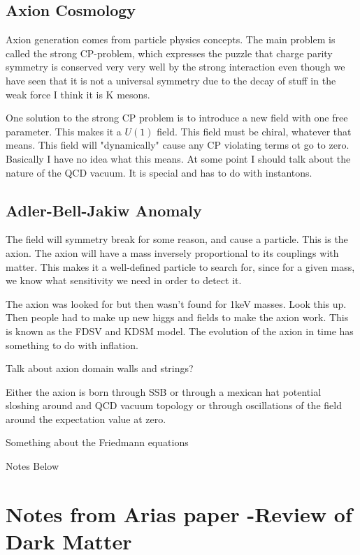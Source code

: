 \documentclass[11pt]{book}
\begin{document}
\subsection{Axion Cosmology}

Axion generation comes from particle physics concepts. The main problem is called the strong CP-problem, which expresses the puzzle that charge parity symmetry is conserved very very well by the strong interaction even though we have seen that it is not a universal symmetry due to the decay of stuff in the weak force I think it is K mesons.

One solution to the strong CP problem is to introduce a new field with one free parameter. This makes it a $U(1)$ field. This field must be chiral, whatever that means. This field will "dynamically" cause any CP violating terms ot go to zero. Basically I have no idea what this means. At some point I should talk about the nature of the QCD vacuum. It is special and has to do with instantons.

\subsection{Adler-Bell-Jakiw Anomaly}

The field will symmetry break for some reason, and cause a particle. This is the axion. The axion will have a mass inversely proportional to its couplings with matter. This makes it a well-defined particle to search for, since for a given mass, we know what sensitivity we need in order to detect it.

The axion was looked for but then wasn't found for 1keV masses. Look this up. Then people had to make up new higgs and fields to make the axion work. This is known as the FDSV and KDSM model. The evolution of the axion in time has something to do with inflation.

Talk about axion domain walls and strings?

Either the axion is born through SSB or through a mexican hat potential sloshing around and QCD vacuum topology or through oscillations of the field around the expectation value at zero. 

Something about the Friedmann equations

{\color{red} Notes Below}

\section{Notes from Arias paper -Review of Dark Matter}
\end{document}
